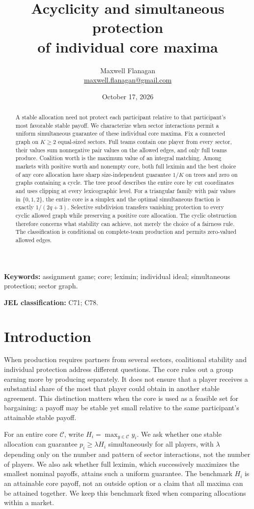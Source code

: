 \documentclass[11pt]{article}
\title{Acyclicity and simultaneous protection\\of individual core maxima}
\author{Maxwell Flanagan\\\small\href{mailto:maxwell.flanagan@gmail.com}{maxwell.flanagan@gmail.com}}
\date{October 17, 2026}
\theoremstyle{remark}\newtheorem{remark}[theorem]{Remark}
\newcommand{\core}{\mathcal C}
\begin{document}
\maketitle
\begin{abstract}
A stable allocation need not protect each participant relative to that
participant's most favorable stable payoff. We characterize when sector
interactions permit a uniform simultaneous guarantee of these individual core
maxima. Fix a connected graph on $K\ge2$ equal-sized sectors. Full teams contain
one player from every sector, their values sum nonnegative pair values on the
allowed edges, and only full teams produce. Coalition worth is the maximum
value of an integral matching. Among markets with positive worth and nonempty
core, both full leximin and the best choice of any core allocation have sharp
size-independent guarantee $1/K$ on trees and zero on graphs containing a
cycle. The tree proof describes the entire core by cut coordinates and uses
clipping at every lexicographic level. For a triangular family with pair values
in $\{0,1,2\}$, the entire core is a simplex and the optimal simultaneous
fraction is exactly $1/(2q+3)$. Selective subdivision transfers vanishing
protection to every cyclic allowed graph while preserving a positive core
allocation. The cyclic obstruction therefore concerns what stability can
achieve, not merely the choice of a fairness rule. The classification is
conditional on complete-team production and permits zero-valued allowed edges.
\end{abstract}
\noindent\textbf{Keywords:} assignment game; core; leximin; individual ideal;
simultaneous protection; sector graph.
\par\noindent\textbf{JEL classification:} C71; C78.

\section{Introduction}
When production requires partners from several sectors, coalitional stability
and individual protection address different questions. The core rules out a
group earning more by producing separately. It does not ensure that a player
receives a substantial share of the most that player could obtain in another
stable agreement. This distinction matters when the core is used as a feasible
set for bargaining: a payoff may be stable yet small relative to the same
participant's attainable stable payoff.

For an entire core $\core$, write $H_i=\max_{y\in\core}y_i$. We ask whether
one stable allocation can guarantee $p_i\ge\lambda H_i$ simultaneously for all
players, with $\lambda$ depending only on the number and pattern of sector
interactions, not the number of players. We also ask whether full leximin,
which successively maximizes the smallest nominal payoffs, attains such a
uniform guarantee. The benchmark $H_i$ is an attainable core payoff, not an
outside option or a claim that all maxima can be attained together. We keep
this benchmark fixed when comparing allocations within a market.
\end{document}
